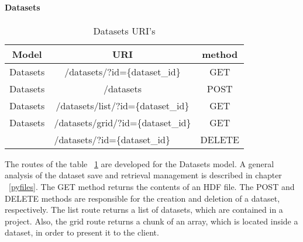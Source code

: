\paragraph{Datasets}
\begin{table}[]
\centering
\begin{tabular}{|c|c|c|}
\hline
\rowcolor[HTML]{32CB00} 
\textbf{Model}                                         & \textbf{URI}                                                               & \textbf{method}                                     \\ \hline
\rowcolor[HTML]{FFFFFF} 
Datasets                                               & /datasets/?id=\{dataset\_id\}                                              & GET                                                 \\ \hline
\rowcolor[HTML]{67FD9A} 
Datasets                                               & /datasets                                                                  & POST                                                \\ \hline
\rowcolor[HTML]{FFFFFF} 
Datasets                                               & /datasets/list/?id=\{dataset\_id\}                                         & GET                                                 \\ \hline
\rowcolor[HTML]{67FD9A} 
Datasets                                               & /datasets/grid/?id=\{dataset\_id\}                                         & GET                                                 \\ \hline
\rowcolor[HTML]{FFFFFF} 
\multicolumn{1}{|l|}{\cellcolor[HTML]{FFFFFF}Datasets} & \multicolumn{1}{l|}{\cellcolor[HTML]{FFFFFF}/datasets/?id=\{dataset\_id\}} & \multicolumn{1}{l|}{\cellcolor[HTML]{FFFFFF}DELETE} \\ \hline
\end{tabular}
\caption{Datasets URI's}
\label{datasetsURI}
\end{table}
The routes of the table ~\ref{datasetsURI} are developed for the Datasets model. A general analysis of the dataset save and retrieval management is described in chapter ~\ref{pyfiles}. The GET method returns the contents of an HDF file. The POST and DELETE methods are responsible for the creation and deletion of a dataset, respectively. The list route returns a list of datasets, which are contained in a project. Also, the grid route returns a chunk of an array, which is located inside a dataset, in order to present it to the client.

